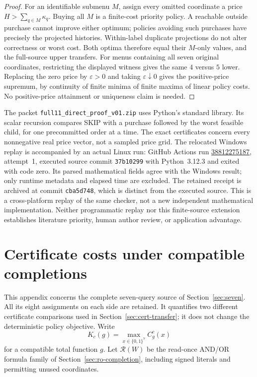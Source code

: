 \documentclass[pdflatex,sn-mathphys-num]{sn-jnl}
\theoremstyle{thmstyleone}
\theoremstyle{thmstylethree}
\theoremstyle{thmstyletwo}
\begin{document}
\begin{proof}
For an identifiable submenu $M$, assign every omitted coordinate a
price $H>\sum_{q\in M}\kappa_q$. Buying all $M$ is a finite-cost priority
policy. A reachable outside purchase cannot improve either optimum;
policies avoiding such purchases have precisely the projected
histories. Within-label duplicate projections do not alter correctness
or worst cost. Both optima therefore equal their $M$-only values, and
the full-source upper transfers.
For menus containing all seven original coordinates, restricting the
displayed witness gives the same $4$ versus $5$ lower.
Replacing the zero price by $\varepsilon>0$ and taking
$\varepsilon\downarrow0$ gives the positive-price supremum, by
continuity of finite minima of finite maxima of linear policy costs.
No positive-price attainment or uniqueness claim is needed.
\end{proof}

The packet \texttt{full11\_direct\_proof\_v01.zip} uses Python's standard
library. Its scalar recursion compares SKIP with a purchase followed by
the worst feasible child, for one precommitted order at a time.
The exact certificates concern every nonnegative real price vector,
not a sampled price grid.
The relocated Windows replay is accompanied by an actual Linux run:
GitHub Actions run \href{https://github.com/SHiJiE1115/newproj/actions/runs/38812275187}{38812275187},
attempt~1, executed source commit \texttt{37b10299} with Python~3.12.3
and exited with code zero. Its parsed mathematical fields agree with
the Windows result; only runtime metadata and elapsed time are excluded.
The retained receipt is archived at commit \texttt{cba5d748}, which
is distinct from the executed source. This is a cross-platform replay
of the same checker, not a new independent mathematical implementation. Neither programmatic replay nor this finite-source
extension establishes literature priority, human author review,
or application advantage.


\section{Certificate costs under compatible completions}
\label{app:certificate-distortion}

This appendix concerns the complete seven-query source of
Section~\ref{sec:seven}. All its eight assignments on each side are
retained. It quantifies two different certificate comparisons used in
Section~\ref{sec:cert-transfer}; it does not change the deterministic
policy objective. Write
\[
 K_c(g)=\max_{x\in\{0,1\}^7}C_g^c(x)
\]
for a compatible total function $g$. Let $\mathcal R(W)$ be the
read-once AND/OR formula family of Section~\ref{sec:ro-completion},
including signed literals and permitting unused coordinates.
\end{document}
